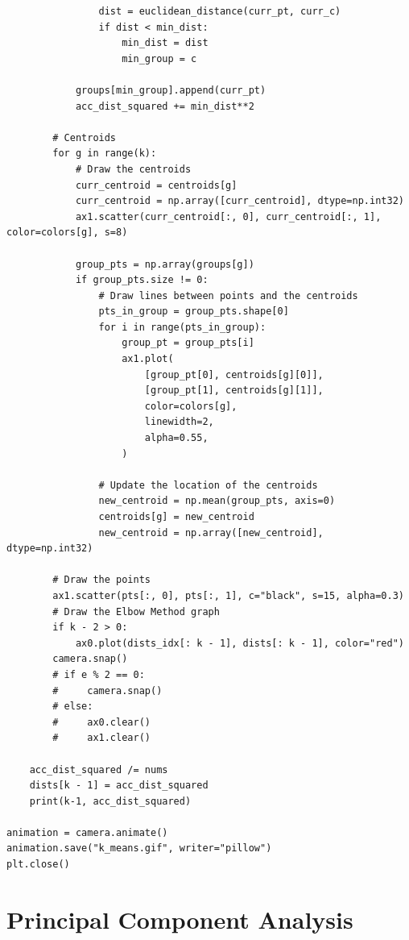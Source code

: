\documentclass[openany]{book}
\begin{document}
\begin{tcolorbox}
\begin{verbatim}
                dist = euclidean_distance(curr_pt, curr_c)
                if dist < min_dist:
                    min_dist = dist
                    min_group = c

            groups[min_group].append(curr_pt)
            acc_dist_squared += min_dist**2

        # Centroids
        for g in range(k):
            # Draw the centroids
            curr_centroid = centroids[g]
            curr_centroid = np.array([curr_centroid], dtype=np.int32)
            ax1.scatter(curr_centroid[:, 0], curr_centroid[:, 1], color=colors[g], s=8)

            group_pts = np.array(groups[g])
            if group_pts.size != 0:
                # Draw lines between points and the centroids
                pts_in_group = group_pts.shape[0]
                for i in range(pts_in_group):
                    group_pt = group_pts[i]
                    ax1.plot(
                        [group_pt[0], centroids[g][0]],
                        [group_pt[1], centroids[g][1]],
                        color=colors[g],
                        linewidth=2,
                        alpha=0.55,
                    )

                # Update the location of the centroids
                new_centroid = np.mean(group_pts, axis=0)
                centroids[g] = new_centroid
                new_centroid = np.array([new_centroid], dtype=np.int32)

        # Draw the points
        ax1.scatter(pts[:, 0], pts[:, 1], c="black", s=15, alpha=0.3)
        # Draw the Elbow Method graph
        if k - 2 > 0:
            ax0.plot(dists_idx[: k - 1], dists[: k - 1], color="red")
        camera.snap()
        # if e % 2 == 0:
        #     camera.snap()
        # else:
        #     ax0.clear()
        #     ax1.clear()

    acc_dist_squared /= nums
    dists[k - 1] = acc_dist_squared
    print(k-1, acc_dist_squared)

animation = camera.animate()
animation.save("k_means.gif", writer="pillow")
plt.close()
\end{verbatim}
\end{tcolorbox}
        
    \section{Principal Component
Analysis}\label{principal-component-analysis}
\end{document}
